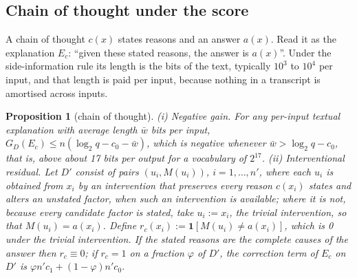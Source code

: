\documentclass[11pt,letterpaper]{article}
\newcommand{\D}{D}
\newcommand{\ind}[1]{\mathbf{1}[#1]}
\newcommand{\cz}{c_{0}}
\newcommand{\co}{c_{1}}
\newcommand{\Ltwo}{\log_{2}}
\theoremstyle{plain}
\newtheorem{proposition}{Proposition}
\theoremstyle{definition}
\theoremstyle{remark}
\begin{document}
\subsection{Chain of thought under the score}

A chain of thought $c(x)$ states reasons and an answer $a(x)$. Read it as the explanation $E_c$: ``given these stated reasons, the answer is $a(x)$''. Under the side-information rule its length is the bits of the text, typically $10^{3}$ to $10^{4}$ per input, and that length is paid per input, because nothing in a transcript is amortised across inputs.

\begin{proposition}[chain of thought]
\label{prop:cot}
(i) \emph{Negative gain.} For any per-input textual explanation with average length $\bar w$ bits per input, $G_{\D}(E_c)\le n(\Ltwo q-\cz-\bar w)$, which is negative whenever $\bar w>\Ltwo q-\cz$, that is, above about 17 bits per output for a vocabulary of $2^{17}$. (ii) \emph{Interventional residual.} Let $\D'$ consist of pairs $(u_i,M(u_i))$, $i=1,\dots,n'$, where each $u_i$ is obtained from $x_i$ by an intervention that preserves every reason $c(x_i)$ states and alters an unstated factor, when such an intervention is available; where it is not, because every candidate factor is stated, take $u_i:=x_i$, the trivial intervention, so that $M(u_i)=a(x_i)$. Define $r_c(x_i):=\ind{M(u_i)\neq a(x_i)}$, which is 0 under the trivial intervention. If the stated reasons are the complete causes of the answer then $r_c\equiv0$; if $r_c=1$ on a fraction $\varphi$ of $\D'$, the correction term of $E_c$ on $\D'$ is $\varphi n'\co+(1-\varphi)n'\cz$.
\end{proposition}
\end{document}
